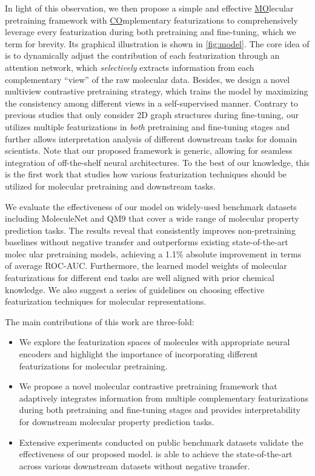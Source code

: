 In light of this observation, we then propose a simple and effective \underline{MO}lecular pretraining framework with \underline{CO}mplementary featurizations to comprehensively leverage every featurization during both pretraining and fine-tuning, which we term \themodel for brevity.
Its graphical illustration is shown in \cref{fig:model}.
The core idea of \themodel is to dynamically adjust the contribution of each featurization through an attention network, which \emph{selectively} extracts information from each complementary ``view'' of the raw molecular data.
Besides, we design a novel multiview contrastive pretraining strategy, which trains the model by maximizing the consistency among different views in a self-supervised manner.
Contrary to previous studies \cite{Stark:2021ug,Liu:2022vr} that only consider 2D graph structures during fine-tuning, our \themodel utilizes multiple featurizations in \emph{both} pretraining and fine-tuning stages and further allows interpretation analysis of different downstream tasks for domain scientists.
Note that our proposed \themodel framework is generic, allowing for seamless integration of off-the-shelf neural architectures.
To the best of our knowledge, this is the first work that studies how various featurization techniques should be utilized for molecular pretraining and downstream tasks.

We evaluate the effectiveness of our \themodel model on widely-used benchmark datasets including MoleculeNet \cite{Wu:2018dv} and QM9 \cite{Ramakrishnan:2014ij} that cover a wide range of molecular property prediction tasks.
The results reveal that \themodel consistently improves non-pretraining baselines without negative transfer and outperforms existing state-of-the-art molec ular pretraining models, achieving a 1.1\% absolute improvement in terms of average ROC-AUC.
Furthermore, the learned model weights of molecular featurizations for different end tasks are well aligned with prior chemical knowledge.
We also suggest a series of guidelines on choosing effective featurization techniques for molecular representations.

The main contributions of this work are three-fold:
\begin{itemize}
	\item We explore the featurization spaces of molecules with appropriate neural encoders and highlight the importance of incorporating different featurizations for molecular pretraining.
	\item We propose a novel molecular contrastive pretraining framework that adaptively integrates information from multiple complementary featurizations during both pretraining and fine-tuning stages and provides interpretability for downstream molecular property prediction tasks.
	\item Extensive experiments conducted on public benchmark datasets validate the effectiveness of our proposed model. \themodel is able to achieve the state-of-the-art across various downstream datasets without negative transfer.
\end{itemize}
